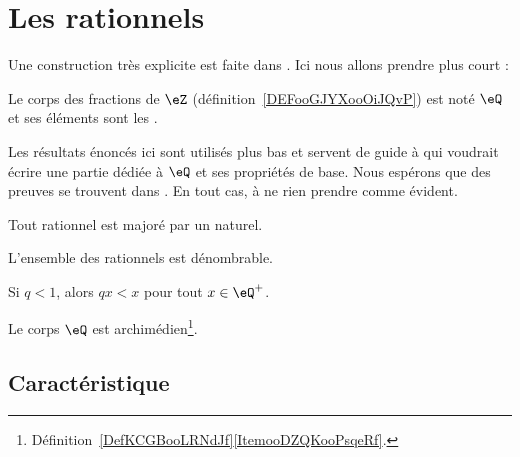 \section{Les rationnels}

Une construction très explicite est faite dans \cite{RWWJooJdjxEK}. Ici nous allons prendre plus court :
\begin{definition}
    Le corps des fractions de \( \eZ\) (définition~\ref{DEFooGJYXooOiJQvP}) est noté \( \eQ\) et ses éléments sont les .
\end{definition}

\begin{normaltext}
    Les résultats énoncés ici sont utilisés plus bas et servent de guide à  qui voudrait écrire une partie dédiée à \( \eQ\) et ses propriétés de base. Nous espérons que des preuves se trouvent dans \cite{RWWJooJdjxEK}. En tout cas,  à ne rien prendre comme évident.
\end{normaltext}

\begin{lemma} \label{LEMooEBTIooGMoHsj}
    Tout rationnel est majoré par un naturel.
\end{lemma}

\begin{proposition}     \label{PROPooDHIAooZysvNs}
    L'ensemble des rationnels est dénombrable.
\end{proposition}

\begin{proposition}     \label{PROPooBTCCooVVvaeL}
    Si \( q<1\), alors \( qx<x\) pour tout \( x\in \eQ^+\).
\end{proposition}

\begin{proposition}     \label{PROPooMXGPooDUkOuv}
    Le corps \( \eQ\) est archimédien\footnote{Définition~\ref{DefKCGBooLRNdJf}\ref{ItemooDZQKooPsqeRf}.}.
\end{proposition}

\subsection{Caractéristique}

